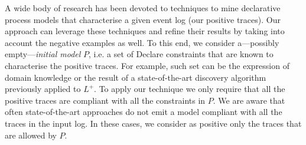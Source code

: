 %





 A wide body of research has been devoted to techniques to mine declarative process models that characterise a given event log (our positive traces). Our approach can leverage these techniques and refine their results by taking into account the negative examples as well. To this end, we consider a---possibly empty---\emph{initial model} $P$, i.e. a set of Declare constraints that are known to characterise the positive traces. For example, such set can be the expression of domain knowledge or the result of a state-of-the-art discovery algorithm previously applied to $L^+$. To apply our technique we only require that all the positive traces are compliant with all the constraints in $P$. 
We are aware that often state-of-the-art approaches do not emit a model compliant with all the traces in the input log. In these cases, we consider as positive only the traces that are allowed by $P$.



